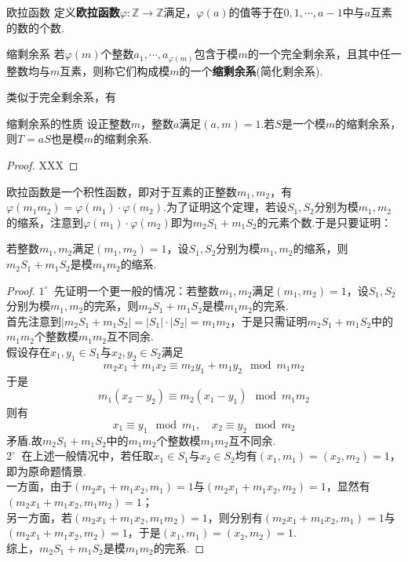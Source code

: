 \documentclass[lang=cn, zihao=5]{elegantbook}
\newcommand{\buzhou}[1]{$#1^{\circ} \ $}
\begin{document}
\begin{definition}{欧拉函数}
	定义\textbf{欧拉函数}$\varphi :\mathbb{Z} \to \mathbb{Z}$满足，$\varphi (a)$的值等于在$0,1,\cdots ,a-1$中与$a$互素的数的个数.
\end{definition}

\begin{definition}{缩剩余系}
	若$\varphi (m)$个整数$a_1,\cdots ,a_{\varphi (m)}$包含于模$m$的一个完全剩余系，且其中任一整数均与$m$互素，则称它们构成模$m$的一个\textbf{缩剩余系}(简化剩余系).
\end{definition}

类似于完全剩余系，有

\begin{theorem}{缩剩余系的性质}
	设正整数$m$，整数$a$满足$(a,m)=1$.若$S$是一个模$m$的缩剩余系，则$T=aS$也是模$m$的缩剩余系.
\end{theorem}
\begin{proof}
	XXX
\end{proof}

欧拉函数是一个积性函数，即对于互素的正整数$m_1,m_2$，有$\varphi (m_1m_2) = \varphi (m_1) \cdot \varphi (m_2)$.为了证明这个定理，若设$S_1,S_2$分别为模$m_1,m_2$的缩系，注意到$\varphi (m_1) \cdot \varphi (m_2)$即为$m_2S_1+m_1S_2$的元素个数.于是只要证明：

\begin{theorem}
	若整数$m_1,m_2$满足$(m_1,m_2)=1$，设$S_1,S_2$分别为模$m_1,m_2$的缩系，则$m_2S_1+m_1S_2$是模$m_1m_2$的缩系.
\end{theorem}
\begin{proof}
	\buzhou{1} 先证明一个更一般的情况：若整数$m_1,m_2$满足$(m_1,m_2)=1$，设$S_1,S_2$分别为模$m_1,m_2$的完系，则$m_2S_1+m_1S_2$是模$m_1m_2$的完系. \\
	首先注意到$|m_2S_1+m_1S_2|=|S_1| \cdot |S_2|=m_1m_2$，于是只需证明$m_2S_1+m_1S_2$中的$m_1m_2$个整数模$m_1m_2$互不同余. \\
	假设存在$x_1,y_1 \in S_1$与$x_2,y_2 \in S_2$满足$$m_2x_1 + m_1x_2 \equiv m_2y_1 + m_1y_2 \mod m_1m_2$$
	于是$$m_1(x_2-y_2) \equiv m_2(x_1-y_1) \mod m_1m_2$$
	则有$$x_1 \equiv y_1 \mod m_1,\quad x_2 \equiv y_2 \mod m_2$$
	矛盾.故$m_2S_1+m_1S_2$中的$m_1m_2$个整数模$m_1m_2$互不同余. \\
	\buzhou{2} 在上述一般情况中，若任取$x_1 \in S_1$与$x_2 \in S_2$均有$(x_1,m_1)=(x_2,m_2)=1$，即为原命题情景. \\
	一方面，由于$(m_2x_1+m_1x_2,m_1)=1$与$(m_2x_1+m_1x_2,m_2)=1$，显然有$(m_2x_1+m_1x_2,m_1m_2)=1$； \\
	另一方面，若$(m_2x_1+m_1x_2,m_1m_2)=1$，则分别有$(m_2x_1+m_1x_2,m_1)=1$与$(m_2x_1+m_1x_2,m_2)=1$，于是$(x_1,m_1)=(x_2,m_2)=1$. \\
	综上，$m_2S_1+m_1S_2$是模$m_1m_2$的完系.
\end{proof}
\end{document}

